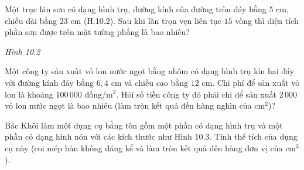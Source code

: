 \begin{practice}
\begin{questions}[series=SBT]
        \item Một trục lăn sơn có dạng hình trụ, đường kính của đường tròn đáy bằng $5$ cm, chiều dài bằng $23$ cm (H.10.2). Sau khi lăn trọn vẹn liên tục $15$ vòng thì diện tích phần sơn được trên mặt tường phẳng là bao nhiêu?

        \begin{center}

            \textit{Hình 10.2}
        \end{center}

        \answerline
        \answerline
        \answerline

        \item Một công ty sản xuất vỏ lon nước ngọt bằng nhôm có dạng hình trụ kín hai đáy với đường kính đáy bằng $6{,}4$ cm và chiều cao bằng $12$ cm. Chi phí để sản xuất vỏ lon là khoảng $100\,000$ đồng/m$^2$. Hỏi số tiền công ty đó phải chi để sản xuất $2\,000$ vỏ lon nước ngọt là bao nhiêu (làm tròn kết quả đến hàng nghìn của cm$^2$)?

        \answerline
        \answerline
        \answerline
        \answerline

        \item Bác Khôi làm một dụng cụ bằng tôn gồm một phần có dạng hình trụ và một phần có dạng hình nón với các kích thước như Hình 10.3. Tính thể tích của dụng cụ này (coi mép hàn không đáng kể và làm tròn kết quả đến hàng đơn vị của cm$^3$).

        \begin{center}


\end{center}
\end{questions}
\end{practice}
